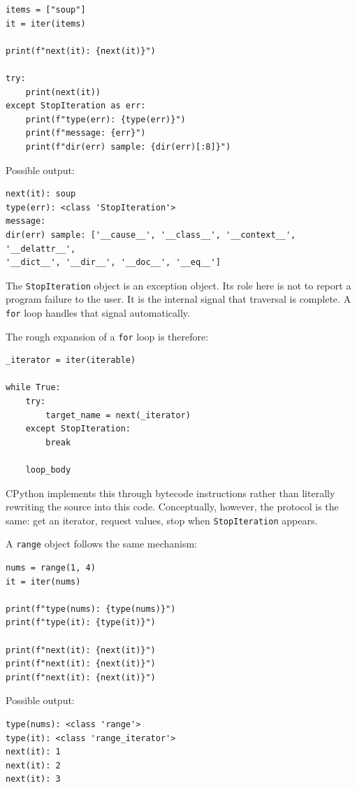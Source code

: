 \begin{verbatim}
items = ["soup"]
it = iter(items)

print(f"next(it): {next(it)}")

try:
    print(next(it))
except StopIteration as err:
    print(f"type(err): {type(err)}")
    print(f"message: {err}")
    print(f"dir(err) sample: {dir(err)[:8]}")
\end{verbatim}

Possible output:

\begin{verbatim}
next(it): soup
type(err): <class 'StopIteration'>
message:
dir(err) sample: ['__cause__', '__class__', '__context__', '__delattr__',
'__dict__', '__dir__', '__doc__', '__eq__']
\end{verbatim}

The \texttt{StopIteration} object is an exception object. Its role here is not to report a program failure to the user. It is the internal signal that traversal is complete. A \texttt{for} loop handles that signal automatically.

The rough expansion of a \texttt{for} loop is therefore:

\begin{verbatim}
_iterator = iter(iterable)

while True:
    try:
        target_name = next(_iterator)
    except StopIteration:
        break

    loop_body
\end{verbatim}

CPython implements this through bytecode instructions rather than literally rewriting the source into this code. Conceptually, however, the protocol is the same: get an iterator, request values, stop when \texttt{StopIteration} appears.

A \texttt{range} object follows the same mechanism:

\begin{verbatim}
nums = range(1, 4)
it = iter(nums)

print(f"type(nums): {type(nums)}")
print(f"type(it): {type(it)}")

print(f"next(it): {next(it)}")
print(f"next(it): {next(it)}")
print(f"next(it): {next(it)}")
\end{verbatim}

Possible output:

\begin{verbatim}
type(nums): <class 'range'>
type(it): <class 'range_iterator'>
next(it): 1
next(it): 2
next(it): 3
\end{verbatim}

